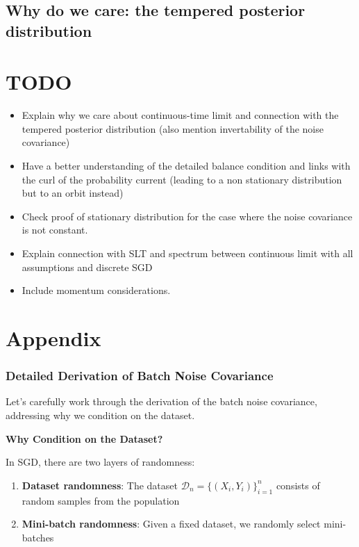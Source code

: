 \documentclass[11pt]{article}
\begin{document}
\subsection{Why do we care: the tempered posterior distribution}



\section{\textbf{TODO}}
\begin{itemize}
    \item Explain why we care about continuous-time limit and connection with the tempered posterior distribution (also mention invertability of the noise covariance)
    \item Have a better understanding of the detailed balance condition and links with the curl of the probability current (leading to a non stationary distribution but to an orbit instead)
    \item Check proof of stationary distribution for the case where the noise covariance is not constant.
    \item Explain connection with SLT and spectrum between continuous limit with all assumptions and discrete SGD
    \item Include momentum considerations.
\end{itemize}
\section{Appendix}

\subsubsection{Detailed Derivation of Batch Noise Covariance}

Let's carefully work through the derivation of the batch noise covariance, addressing why we condition on the dataset.

\textbf{Why Condition on the Dataset?}

In SGD, there are two layers of randomness:
\begin{enumerate}
    \item \textbf{Dataset randomness}: The dataset $\mathcal{D}_n = \{(X_i, Y_i)\}_{i=1}^n$ consists of random samples from the population
    \item \textbf{Mini-batch randomness}: Given a fixed dataset, we randomly select mini-batches
\end{enumerate}
\end{document}
